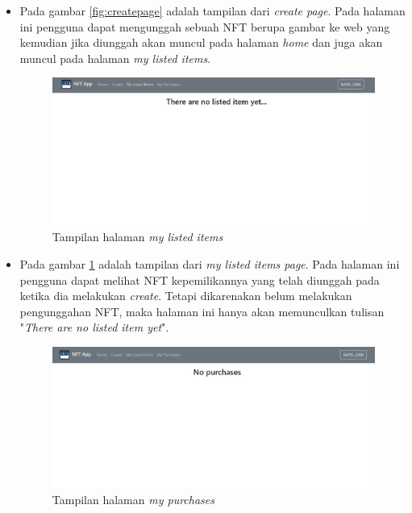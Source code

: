 \begin{itemize}
        \item Pada gambar \ref{fig:createpage} adalah tampilan dari \emph{create page}. Pada halaman ini pengguna dapat mengunggah sebuah NFT berupa gambar ke web yang kemudian jika diunggah akan muncul pada halaman \emph{home} dan juga akan muncul pada halaman \emph{my listed items}.
    
        \begin{figure} [H] \centering
          \includegraphics[scale=0.27]{gambar/listing_page.jpg}
          \caption{Tampilan halaman \emph{my listed items}}
          \label{fig:listingpage}
          \end{figure}
        
        \item Pada gambar \ref{fig:listingpage} adalah tampilan dari \emph{my listed items page}. Pada halaman ini pengguna dapat melihat NFT kepemilikannya yang telah diunggah pada ketika dia melakukan \emph{create}. Tetapi dikarenakan belum melakukan pengunggahan NFT, maka halaman ini hanya akan memunculkan tulisan "\emph{There are no listed item yet}".

        \begin{figure} [H] \centering
          \includegraphics[scale=0.27]{gambar/purchase_page.jpg}
          \caption{Tampilan halaman \emph{my purchases}}
          \label{fig:purchasepage}
          \end{figure}
        

\end{itemize}
